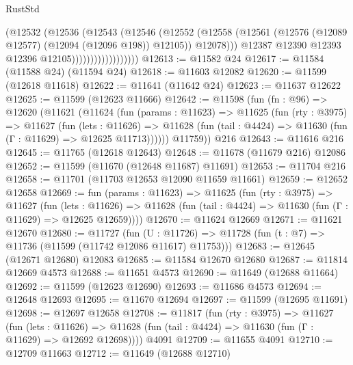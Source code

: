 \begin{lexlean}{RustStd}
\begin{coremodule}
                                  (@12532
                                    (@12536
                                      (@12543
                                        (@12546
                                          (@12552
                                            (@12558
                                              (@12561
                                                (@12576
                                                  (@12089 @12577)
                                                  (@12094 (@12096 @198))
                                                  @12105))
                                              @12078)))
                                        @12387
                                        @12390
                                        @12393
                                        @12396
                                        @12105))))))))))))))))))
@12613 := @11582 @24
@12617 := @11584 (@11588 @24) (@11594 @24)
@12618 := @11603 @12082
@12620 := @11599 (@12618 @11618)
@12622 := @11641 (@11642 @24)
@12623 := @11637 @12622
@12625 := @11599 (@12623 @11666)
@12642 := @11598
    (fun (fn : @96) =>
    @12620
      (@11621
        (@11624
          (fun (params : @11623) =>
          @11625
            (fun (rty : @3975) =>
            @11627
              (fun (lets : @11626) =>
              @11628 (fun (tail : @4424) => @11630 (fun (Γ : @11629) => @12625 @11713))))))
        @11759))
    @216
@12643 := @11616 @216
@12645 := @11765 (@12618 @12643)
@12648 := @11678 (@11679 @216) @12086
@12652 := @11599 (@11670 (@12648 @11687) @11691)
@12653 := @11704 @216
@12658 := @11701 (@11703 @12653 @12090 @11659 @11661)
@12659 := @12652 @12658
@12669 := fun (params : @11623) =>
  @11625
    (fun (rty : @3975) =>
    @11627
      (fun (lets : @11626) =>
      @11628 (fun (tail : @4424) => @11630 (fun (Γ : @11629) => @12625 @12659))))
@12670 := @11624 @12669
@12671 := @11621 @12670
@12680 := @11727
    (fun (U : @11726) => @11728 (fun (t : @7) => @11736 (@11599 (@11742 @12086 @11617) @11753)))
@12683 := @12645 (@12671 @12680) @12083
@12685 := @11584 @12670 @12680
@12687 := @11814 @12669 @4573
@12688 := @11651 @4573
@12690 := @11649 (@12688 @11664)
@12692 := @11599 (@12623 @12690)
@12693 := @11686 @4573
@12694 := @12648 @12693
@12695 := @11670 @12694
@12697 := @11599 (@12695 @11691)
@12698 := @12697 @12658
@12708 := @11817
    (fun (rty : @3975) =>
    @11627
      (fun (lets : @11626) =>
      @11628 (fun (tail : @4424) => @11630 (fun (Γ : @11629) => @12692 @12698))))
    @4091
@12709 := @11655 @4091
@12710 := @12709 @11663
@12712 := @11649 (@12688 @12710)

\end{coremodule}
\end{lexlean}
